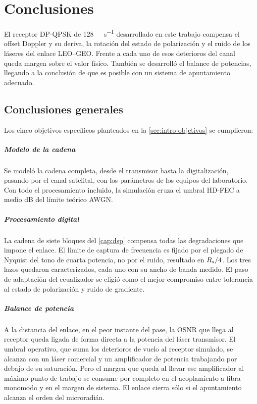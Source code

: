 
\chapter{Conclusiones}
\label{cap:conclusiones}

El receptor DP-QPSK de \SI{128}{\giga\bit\per\second} desarrollado en este
trabajo compensa el offset Doppler y su deriva, la rotaci\'on del estado de
polarizaci\'on y el ruido de los l\'aseres del enlace LEO--GEO. Frente a cada
uno de esos deterioros del canal queda margen sobre el valor f\'isico. Tambi\'en
se desarroll\'o el balance de potencias, llegando a la conclusi\'on de que es posible
con un sistema de apuntamiento adecuado.

\section{Conclusiones generales}
\label{sec:con-generales}

Los cinco objetivos espec\'ificos planteados en la \cref{sec:intro-objetivos}
se cumplieron:

\paragraph{Modelo de la cadena}
Se model\'o la cadena completa, desde el transmisor hasta la digitalizaci\'on,
pasando por el canal satelital, con los par\'ametros de los equipos del
laboratorio. Con todo el procesamiento incluido, la simulaci\'on cruza el
umbral HD-FEC a medio dB del l\'imite te\'orico AWGN.

\paragraph{Procesamiento digital}
La cadena de siete bloques del \cref{cap:dsp} compensa todas las degradaciones
que impone el enlace. El l\'imite de captura de frecuencia es fijado por
el plegado de Nyquist del tono de cuarta potencia, no por el ruido, resultado en $R_{s}/4$. Los tres lazos
quedaron caracterizados, cada uno con su ancho de banda medido. El paso de
adaptaci\'on del ecualizador se eligi\'o como el mejor compromiso entre
tolerancia al estado de polarizaci\'on y ruido de gradiente.

\paragraph{Balance de potencia}
A la distancia del enlace, en el peor instante del pase, la OSNR que llega al
receptor queda ligada de forma directa a la potencia del l\'aser transmisor. El
umbral operativo, que suma los deterioros de vuelo al receptor simulado, se
alcanza con un l\'aser comercial y un amplificador de potencia trabajando por
debajo de su saturaci\'on. Pero el margen que queda al llevar ese
amplificador al m\'aximo punto de trabajo se consume por completo en el acoplamiento a fibra monomodo
y en el margen de sistema. El enlace cierra s\'olo si el apuntamiento alcanza
el orden del microradi\'an.

